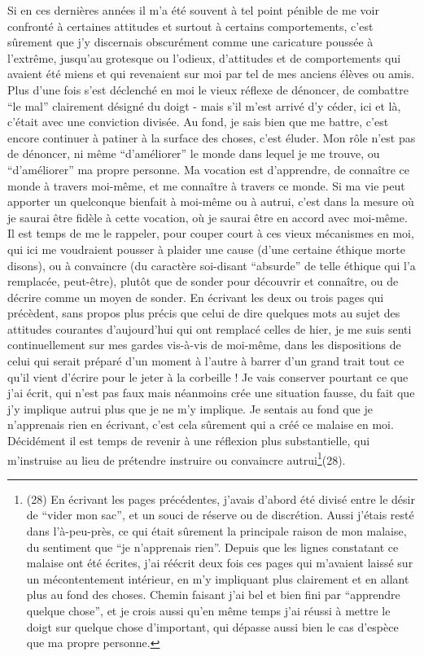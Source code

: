 Si en ces dernières années il m'a été souvent à tel point pénible de me voir confronté à certaines attitudes et surtout à certains comportements, c'est sûrement que j'y discernais obscurément comme une caricature poussée à l'extrême, jusqu'au grotesque ou l'odieux, d'attitudes et de comportements qui avaient été miens et qui revenaient sur moi par tel de mes anciens élèves ou amis. Plus d'une fois s'est déclenché en moi le vieux réflexe de dénoncer, de combattre ``le mal'' clairement désigné du doigt - mais s'il m'est arrivé d'y céder, ici et là, c'était avec une conviction divisée. Au fond, je sais bien que me battre, c'est encore continuer à patiner à la surface des choses, c'est éluder. Mon rôle n'est pas de dénoncer, ni même ``d'améliorer'' le monde dans lequel je me trouve, ou ``d'améliorer'' ma propre personne. Ma vocation est d'apprendre, de connaître ce monde à travers moi-même, et me connaître à travers ce monde. Si ma vie peut apporter un quelconque bienfait à moi-même ou à autrui, c'est dans la mesure où je saurai être fidèle à cette vocation, où je saurai être en accord avec moi-même. Il est temps de me le rappeler, pour couper court à ces vieux mécanismes en moi, qui ici me voudraient pousser à plaider une cause (d'une certaine éthique morte disons), ou à convaincre (du caractère soi-disant ``absurde'' de telle éthique qui l'a remplacée, peut-être), plutôt que de sonder pour découvrir et connaître, ou de décrire comme un moyen de sonder. En écrivant les deux ou trois pages qui précèdent, sans propos plus précis que celui de dire quelques mots au sujet des attitudes courantes d'aujourd'hui qui ont remplacé celles de hier, je me suis senti continuellement sur mes gardes vis-à-vis de moi-même, dans les dispositions de celui qui serait préparé d'un moment à l'autre à barrer d'un grand trait tout ce qu'il vient d'écrire pour le jeter à la corbeille ! Je vais conserver pourtant ce que j'ai écrit, qui n'est pas faux mais néanmoins crée une situation fausse, du fait que j'y implique autrui plus que je ne m'y implique. Je sentais au fond que je n'apprenais rien en écrivant, c'est cela sûrement qui a créé ce malaise en moi. Décidément il est temps de revenir à une réflexion plus substantielle, qui m'instruise au lieu de prétendre instruire ou convaincre autrui\footnote{(28) En écrivant les pages précédentes, j'avais d'abord été divisé entre le désir de ``vider mon sac'', et un souci de réserve ou de discrétion. Aussi j'étais resté dans l'à-peu-près, ce qui était sûrement la principale raison de mon malaise, du sentiment que ``je n'apprenais rien''. Depuis que les lignes constatant ce malaise ont été écrites, j'ai réécrit deux fois ces pages qui m'avaient laissé sur un mécontentement intérieur, en m'y impliquant plus clairement et en allant plus au fond des choses. Chemin faisant j'ai bel et bien fini par ``apprendre quelque chose'', et je crois aussi qu'en même temps j'ai réussi à mettre le doigt sur quelque chose d'important, qui dépasse aussi bien le cas d'espèce que ma propre personne.}(28).

